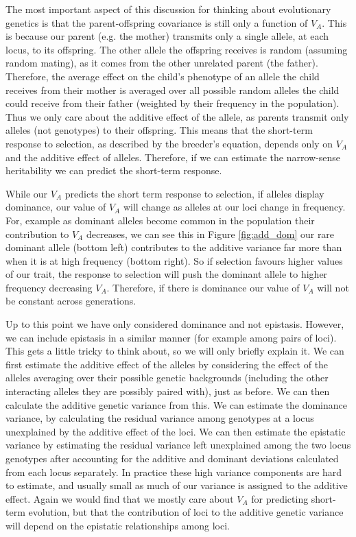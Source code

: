 The most important aspect of this discussion for thinking about
evolutionary genetics is that the parent-offspring covariance is still
only a function of $V_A$. This is because our parent (e.g. the mother) transmits only a
single allele, at each locus, to its offspring. The other allele the
offspring receives is random (assuming random mating), as it comes
from the other unrelated parent (the father). Therefore, the average
effect on the child's phenotype of
an allele the child receives from their mother is averaged over
all possible random alleles the child could receive from their father (weighted by their frequency in the population). Thus we only
care about the additive effect of the allele, as parents transmit only
alleles (not genotypes) to their offspring. This means that the short-term response
to selection, as described by the breeder's equation, depends only on
$V_A$ and the additive effect of alleles. Therefore, if we can
estimate the narrow-sense heritability we can predict the short-term response.


While our $V_A$ predicts the short term response to selection, if
alleles display dominance, our value of $V_A$ will change as alleles
at our loci change in frequency. For, example as dominant alleles become common
in the population their contribution to $V_A$ decreases, we can see
this in Figure \ref{fig:add_dom} our rare dominant allele (bottom left)
contributes to the additive variance far more than when it is at high
frequency (bottom right). So if selection favours higher values of our
trait, the response to selection will push the dominant allele to
higher frequency decreasing $V_A$. Therefore,
if there is dominance our value of $V_A$ will not be constant across generations.

Up to this point we have only considered dominance and not epistasis. However, we can include epistasis in a similar manner (for example among pairs of loci). This gets a little
tricky to think about, so we will only briefly explain it. 
 We can first estimate the additive effect of the
alleles by considering the effect of the alleles averaging over their possible genetic backgrounds (including the other interacting alleles they are possibly paired with), just as before. We can then
calculate the additive genetic variance from this. We can estimate
the dominance variance, by calculating the residual variance among
genotypes at a locus unexplained by the additive effect of the
loci. We can then estimate the epistatic variance by estimating the
residual variance left unexplained among the two locus genotypes after accounting for the additive and dominant deviations calculated from each locus separately. In practice these
high variance components are hard to estimate, and usually small as
much of our variance is assigned to the additive effect. Again we
would find that we mostly care about $V_A$ for predicting short-term
evolution, but that the contribution of loci to the additive genetic
variance will depend on the epistatic relationships among loci.



